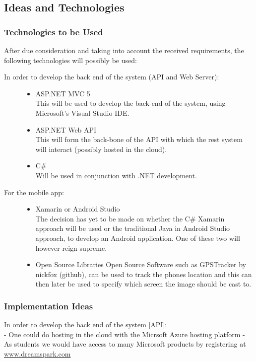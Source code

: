 \subsection{Ideas and Technologies}
\subsubsection{Technologies to be Used}
After due consideration and taking into account the received requirements, the following technologies will possibly be used:
\begin{description}
	\item[In order to develop the back end of the system (API and Web Server):]\hfill
\begin{itemize}
	\item{ASP.NET MVC 5}\hfill\\
	This will be used to develop the back-end of the system, using Microsoft's Visual 	Studio IDE.
	\item{ASP.NET Web API}\hfill\\
	This will form the back-bone of the API with which the rest system will interact (possibly hosted in the cloud).
	\item{C\#}\hfill\\
	Will be used in conjunction with .NET development.
\end{itemize}	

	\item[For the mobile app:]\hfill
	\begin{itemize}
		\item{Xamarin or Android Studio}\hfill\\
		The decision has yet to be made on whether the C\# Xamarin approach will be used or the traditional Java in Android Studio approach, to develop an Android application. One of these two will however reign supreme.
		\item{Open Source Libraries}
		Open Source Software such as GPSTracker by nickfox (github), can be used to track the phones location and this can then later be used to specify which screen the image should be cast to.
	\end{itemize}
	
\end{description}
	
\subsubsection{Implementation Ideas}
In order to develop the back end of the system [API]:\\
- One could do hosting in the cloud with the Micrsoft Azure hosting platform
- As students we would have access to many Microsoft products by registering at \href{http://www.dreamspark.com}{www.dreamspark.com}\\

